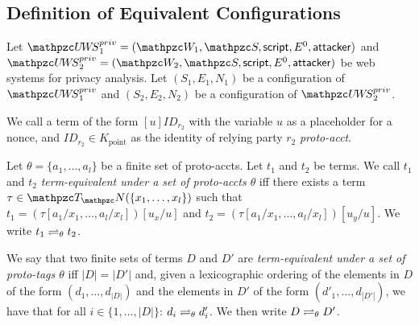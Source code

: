   \subsection{Definition of Equivalent Configurations}\label{app:rp:defin-equiv-stat}
  
  Let $\uppressoprivwebsystem_1 = (\bidsystem_1, \scriptset, \mathsf{script}, E^0, \fAP{attacker})$ 
  and $\uppressoprivwebsystem_2 = (\bidsystem_2, \scriptset, \mathsf{script}, E^0, \fAP{attacker})$ 
  be \uppresso web systems for privacy analysis. 
  Let $(S_1,E_1,N_1)$ 
  be a configuration of $\uppressoprivwebsystem_1$ and 
  $(S_2,E_2,N_2)$ 
  be a configuration of $\uppressoprivwebsystem_2$.
  
  \begin{definition}
    We call a term of the form $[u]ID_{r_2}$ with the variable
    $u$ as a placeholder for a nonce, and 
    $ID_{r_2}\in K_\text{point}$ as the identity of 
    relying party $r_2$ \emph{proto-acct}.
  \end{definition}
  
  \begin{definition}
    Let $\theta = \{a_1, \ldots, a_l \}$ be a finite set of 
    proto-accts.
    Let $t_1$ and $t_2$ be terms. We call $t_1$ and $t_2$
    \emph{term-equivalent under a set of proto-accts $\theta$} 
    iff there exists a term $\tau \in \terms(\{x_1,\dots,x_l\})$ 
    such that
    $t_1 = (\tau [ a_1 / x_1 , \dots , a_l / x_l ])[ u_x / u ]$ 
    and
    $t_2 = (\tau [ a_1 / x_1 , \dots , a_l / x_l ])[ u_y / u ]$.
    We write $t_1 \rightleftharpoons_{\theta} t_2$.
  
    We say that two finite sets of terms $D$ and $D'$ are
    \emph{term-equivalent under a set of proto-tags $\theta$} 
    iff $|D| = |D'|$ and, given a lexicographic ordering of the 
    elements in $D$ of the form $(d_1,\dots,d_{|D|})$ and the 
    elements in $D'$ of the form $(d'_1,\dots,d_{|D'|})$, we 
    have that for all 
    $i \in \{1,\dots,|D|\}$: $d_i \rightleftharpoons_{\theta} d'_i$. 
    We then write $D \rightleftharpoons_{\theta} D'$.
  \end{definition}
  
